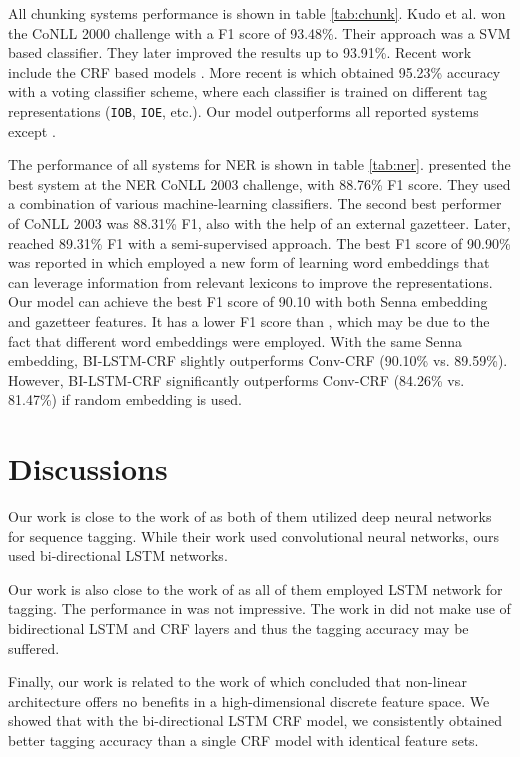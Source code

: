 \documentclass[11pt,a4paper]{article}
\begin{document}
All chunking systems performance is shown in table \ref{tab:chunk}. Kudo et al. won the CoNLL 2000 challenge with a F1 score of 93.48\%. Their approach was a SVM based classifier. They later improved the results up to 93.91\%. Recent work include the CRF based models \cite{sha1,mcdonald1,sun2}. More recent is \cite{shen2} which obtained 95.23\% accuracy with a voting classifier scheme, where each classifier is trained on different tag representations (\texttt{IOB}, \texttt{IOE}, etc.). Our model outperforms all reported systems except \cite{shen2}. 


The performance of all systems for NER is shown in table \ref{tab:ner}. \cite{florian1} presented the best system at the NER CoNLL 2003 challenge, with 88.76\%
F1 score. They used a combination of various machine-learning classifiers. The second best performer of CoNLL 2003 \cite{chieu1}  was 88.31\% F1, also with the help of an external gazetteer.  Later, \cite{ando1} reached 89.31\% F1 with a semi-supervised approach. The best F1 score of 90.90\% was reported in \cite{passos1} which  employed a new form of learning word embeddings that can leverage information from relevant lexicons to improve the representations. Our model can achieve the best F1 score of 90.10 with both Senna embedding and gazetteer features. It has a lower F1 score than \cite{passos1} , which may be  due to the fact that different word embeddings were employed. With the same Senna embedding, BI-LSTM-CRF slightly outperforms Conv-CRF (90.10\% vs. 89.59\%). However, BI-LSTM-CRF significantly outperforms Conv-CRF (84.26\% vs. 81.47\%) if random embedding is used.



\section{Discussions} \label{sec:discussion}
Our work is close to the work of \cite{collobert1} as both of them utilized deep neural networks for sequence tagging. While their work used convolutional neural networks, ours used bi-directional LSTM networks. 

Our work is also close to the work of \cite{hammerton1,yao2} as all of them employed LSTM network for tagging. The performance in \cite{hammerton1} was not impressive. The work in \cite{yao2} did not make use of bidirectional LSTM and CRF layers and thus the tagging accuracy may be suffered.

Finally, our work is related to the work of \cite{wang1} which concluded that non-linear architecture offers no benefits in a high-dimensional discrete feature space. We showed that with the bi-directional LSTM CRF model, we consistently obtained better tagging accuracy than a single CRF model with identical feature sets.
\end{document}
